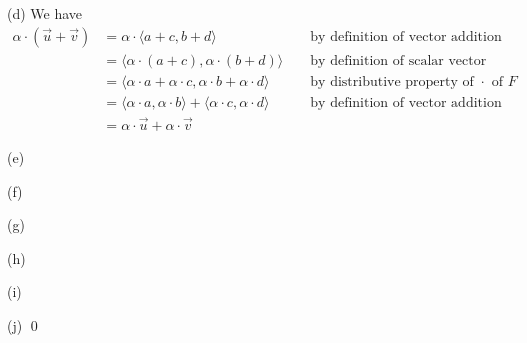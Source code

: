 (d)
We have
\begin{align*}
  \alpha \cdot (\vec{u} + \vec{v})
  &= \alpha \cdot \langle a + c, b + d \rangle & & \text{ by definition of vector addition} \\
  &= \langle \alpha \cdot (a + c), \alpha \cdot (b + d)\rangle & & \text{ by definition of scalar vector multiplication} \\
  &= \langle \alpha \cdot a + \alpha \cdot c, \alpha \cdot b + \alpha \cdot d\rangle & & \text{ by distributive property of $\cdot$ of $F$} \\
  &= \langle \alpha \cdot a, \alpha \cdot b \rangle + \langle \alpha \cdot c, \alpha \cdot d\rangle & & \text{ by definition of vector addition} \\
  &= \alpha \cdot \vec{u} + \alpha \cdot \vec{v}  
\end{align*}

(e)

(f)

(g)

(h)

(i)

(j)
\qed

